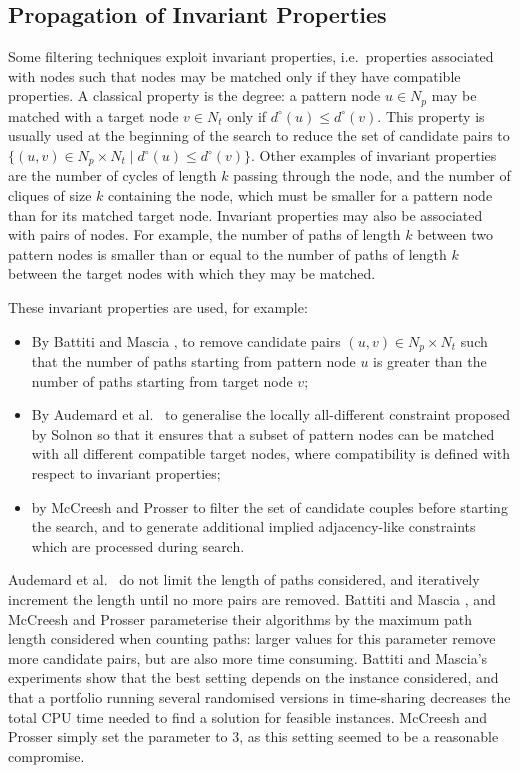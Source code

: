 \documentclass{llncs}
\begin{document}
\subsection{Propagation of Invariant Properties}

Some filtering techniques exploit invariant properties, i.e.\ properties associated with nodes such
that nodes may be matched only if they have compatible properties. A classical property is the
degree: a pattern node $u\in N_p$ may be matched with a target node $v\in N_t$ only if
$d^\circ(u)\leq d^\circ(v)$. This property is usually used at the beginning of the search to reduce
the set of candidate pairs to $\{(u,v)\in N_p\times N_t\;|\;d^\circ(u)\leq d^\circ(v)\}$.  Other
examples of invariant properties are the number of cycles of length $k$ passing through the node,
and the number of cliques of size $k$ containing the node, which must be smaller for a pattern node
than for its matched target node.  Invariant properties may also be associated with pairs of nodes.
For example, the number of paths of length $k$ between two pattern nodes is smaller than or equal to
the number of paths of length $k$ between the target nodes with which they may be matched.

These invariant properties are used, for example:

\begin{itemize}
\item  By Battiti and Mascia \cite{battiti-mascia07}, to remove candidate pairs $(u,v)\in N_p\times
    N_t$ such that the number of paths starting from  pattern node $u$ is greater than the number of
    paths starting from  target node $v$;
\item By Audemard et al.\ \cite{Audemard:2014} to generalise the locally all-different constraint
    proposed by Solnon \cite{Solnon:2010} so that it ensures that a subset of pattern nodes can be
    matched with all different compatible target nodes, where compatibility is defined with respect
    to invariant properties;
\item by McCreesh and Prosser \cite{McCreesh:2015} to filter the set of candidate couples before
    starting the search, and to generate additional implied adjacency-like constraints which are
    processed during search.
\end{itemize}

\noindent Audemard et al.\ \cite{Audemard:2014} do not limit the length of paths considered, and
iteratively increment the length until no more pairs are removed. Battiti and Mascia
\cite{battiti-mascia07}, and McCreesh and Prosser \cite{McCreesh:2015} parameterise their algorithms
by the maximum path length considered when counting paths: larger values for this parameter remove
more candidate pairs, but are also more time consuming. Battiti and Mascia's experiments show that
the best setting depends on the instance considered, and that a portfolio running several randomised
versions in time-sharing decreases the total CPU time needed to find a solution for feasible
instances. McCreesh and Prosser simply set the parameter to 3, as this setting seemed to be a
reasonable compromise.
\end{document}

